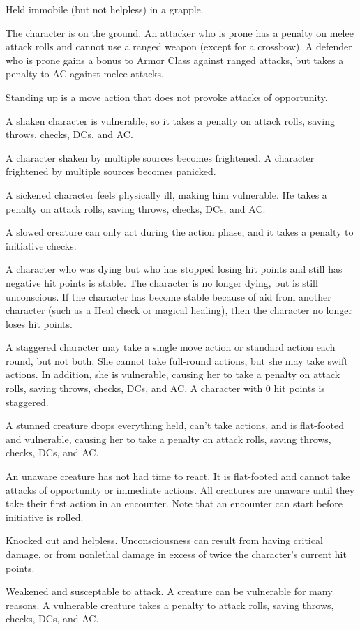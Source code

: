  Held immobile (but not helpless) in a grapple.

 The character is on the ground. An attacker who is prone has a  penalty on melee attack rolls and cannot use a ranged weapon (except for a crossbow). A defender who is prone gains a  bonus to Armor Class against ranged attacks, but takes a  penalty to AC against melee attacks.

Standing up is a move action that does not provoke attacks of opportunity.

 A shaken character is vulnerable, so it takes a  penalty on attack rolls, saving throws, checks, DCs, and AC.

A character shaken by multiple sources becomes frightened. A character frightened by multiple sources becomes panicked.

 A sickened character feels physically ill, making him vulnerable. He takes a  penalty on attack rolls, saving throws, checks, DCs, and AC.

 A slowed creature can only act during the action phase, and it takes a  penalty to initiative checks.

 A character who was dying but who has stopped losing hit points and still has negative hit points is stable. The character is no longer dying, but is still unconscious. If the character has become stable because of aid from another character (such as a Heal check or magical healing), then the character no longer loses hit points.

 A staggered character may take a single move action or standard action each round, but not both. She cannot take full-round actions, but she may take swift actions. In addition, she is vulnerable, causing her to take a  penalty on attack rolls, saving throws, checks, DCs, and AC. A character with 0 hit points is staggered.

 A stunned creature drops everything held, can't take actions, and is flat-footed and vulnerable, causing her to take a  penalty on attack rolls, saving throws, checks, DCs, and AC.

 An unaware creature has not had time to react. It is flat-footed and cannot take attacks of opportunity or immediate actions. All creatures are unaware until they take their first action in an encounter. Note that an encounter can start before initiative is rolled.

 Knocked out and helpless. Unconsciousness can result from having critical damage, or from nonlethal damage in excess of twice the character's current hit points.

 Weakened and susceptable to attack. A creature can be vulnerable for many reasons. A vulnerable creature takes a  penalty to attack rolls, saving throws, checks, DCs, and AC.
